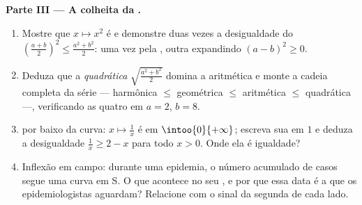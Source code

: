 \begin{problem}
\medskip
\noindent\textbf{Parte III --- A colheita da .}
\begin{enumerate}[resume]
  \item Mostre que $x \mapsto x^2$ é  e demonstre duas
        vezes a desigualdade do 
        $\left(\frac{a + b}{2}\right)^2 \leq
        \frac{a^2 + b^2}{2}$: uma vez pela , outra
        expandindo $(a - b)^2 \geq 0$.
  \item Deduza que a \emph{ quadrática}
        $\sqrt{\frac{a^2 + b^2}{2}}$ domina a  aritmética e
        monte a cadeia completa da série --- harmônica $\leq$
        geométrica $\leq$ aritmética $\leq$ quadrática ---,
        verificando as quatro em $a = 2$, $b = 8$.
  \item {} por baixo da curva: $x \mapsto \frac1x$ é
         em $\intoo{0}{+\infty}$; escreva sua  em
        $1$ e deduza a desigualdade $\frac1x \geq 2 - x$ para
        todo $x > 0$. Onde ela é igualdade?
  \item Inflexão em campo: durante uma epidemia, o número
        acumulado de casos segue uma curva em S. O que acontece
        no seu , e por que essa data é a que os
        epidemiologistas aguardam? Relacione com o sinal da
        segunda  de cada lado.
\end{enumerate}


\end{problem}
